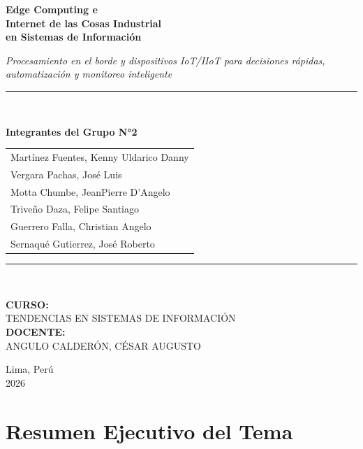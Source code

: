 ﻿\documentclass[12pt,a4paper,oneside]{article}
\begin{document}
\begin{titlepage}
    \centering
    \vspace*{1cm}
    {\Huge\bfseries Edge Computing e\\[0.3cm] Internet de las Cosas Industrial\\[0.3cm] en Sistemas de Información\par}
    \vspace{1.5cm}
    {\Large\itshape Procesamiento en el borde y dispositivos IoT/IIoT para decisiones rápidas, automatización y monitoreo inteligente\par}
    \vspace{2cm}
    \rule{0.8\textwidth}{0.5pt}\\[0.5cm]
    {\Large\bfseries Integrantes del Grupo N°2\par}
    \vspace{0.5cm}
    \begin{tabular}{l}
        Martínez Fuentes, Kenny Uldarico Danny \\
        Vergara Pachas, José Luis \\
        Motta Chumbe, JeanPierre D'Angelo \\
        Triveño Daza, Felipe Santiago \\
        Guerrero Falla, Christian Angelo \\
        Sernaqué Gutierrez, José Roberto \\
    \end{tabular}
    \rule{0.8\textwidth}{0.5pt}\\[1.5cm]
    \begin{flushleft}
        \textbf{CURSO:} \\
        TENDENCIAS EN SISTEMAS DE INFORMACIÓN \\[0.5cm]
        \textbf{DOCENTE:} \\
        ANGULO CALDERÓN, CÉSAR AUGUSTO
    \end{flushleft}
    \vfill
    {\Large Lima, Perú\\2026\par}
\end{titlepage}

\tableofcontents
\newpage

\section{Resumen Ejecutivo del Tema}
\end{document}
